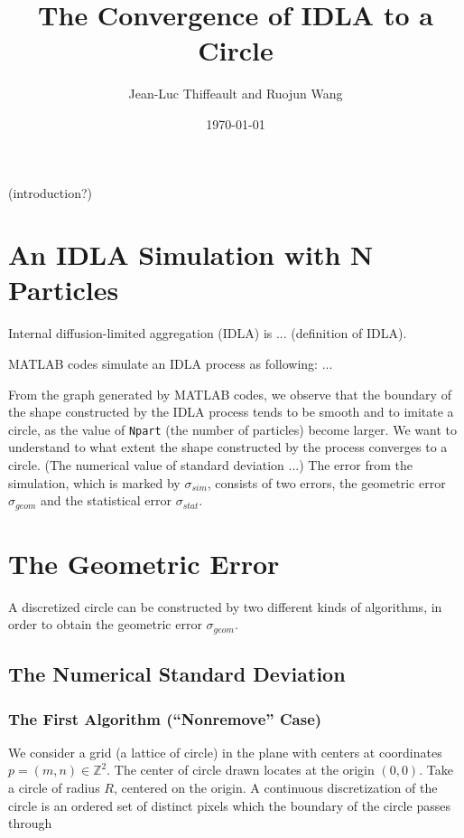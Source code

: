\documentclass[letterpaper]{article}
\title{	
	\normalfont \normalsize 
	\huge The Convergence of IDLA to a Circle \\ %
}
\author{Jean-Luc Thiffeault and Ruojun Wang} %
\date{\normalsize\today} %
\numberwithin{equation}{section} %
\numberwithin{figure}{section} %
\numberwithin{table}{section} %
\begin{document}
	
\maketitle %
	
	
(introduction?)

\section{An IDLA Simulation with N Particles}
	
Internal diffusion-limited aggregation (IDLA) is ... (definition of IDLA). 

MATLAB codes simulate an IDLA process as following: ...

From the graph generated by MATLAB codes, we observe that the boundary of the shape constructed by the IDLA process tends to be smooth and to imitate a circle, as the value of \texttt{Npart} (the number of particles) become larger. We want to understand to what extent the shape constructed by the process converges to a circle. (The numerical value of standard deviation ...) The error from the simulation, which is marked by $\sigma_{sim}$, consists of two errors, the geometric error $\sigma_{geom}$ and the statistical error $\sigma_{stat}$. 	

\section{The Geometric Error}

A discretized circle can be constructed by two different kinds of algorithms, in order to obtain the geometric error $\sigma_{geom}$. 

\subsection{The Numerical Standard Deviation}

\subsubsection{The First Algorithm (\enquote{Nonremove} Case)}
We consider a grid (a lattice of circle) in the plane with centers at coordinates $p=(m, n)\in\mathbb{Z}^2$. The center of circle drawn locates at the origin $(0,0)$. Take a circle of radius $R$, centered on the origin. A continuous discretization of the circle is an ordered set of distinct pixels which the boundary of the circle passes through
\end{document}
